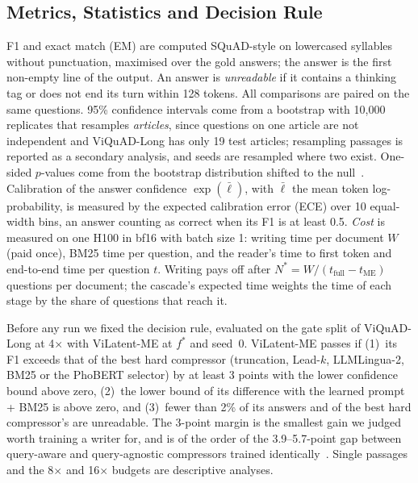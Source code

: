 \subsection{Metrics, Statistics and Decision Rule}
\label{sec:stats}
F1 and exact match (EM) are computed SQuAD-style on lowercased syllables without punctuation, maximised over the gold answers; the answer is the first non-empty line of the output.
An answer is \emph{unreadable} if it contains a thinking tag or does not end its turn within 128 tokens.
All comparisons are paired on the same questions.
95\% confidence intervals come from a bootstrap with 10,000 replicates that resamples \emph{articles}, since questions on one article are not independent and ViQuAD-Long has only 19 test articles; resampling passages is reported as a secondary analysis, and seeds are resampled where two exist.
One-sided $p$-values come from the bootstrap distribution shifted to the null~\cite{efron1993bootstrap}.
Calibration of the answer confidence $\exp(\bar\ell)$, with $\bar\ell$ the mean token log-probability, is measured by the expected calibration error (ECE) over 10 equal-width bins, an answer counting as correct when its F1 is at least 0.5.
\emph{Cost} is measured on one H100 in bf16 with batch size 1: writing time per document $W$ (paid once), BM25 time per question, and the reader's time to first token and end-to-end time per question $t$.
Writing pays off after $N^\ast = W / (t_{\mathrm{full}} - t_{\mathrm{ME}})$ questions per document; the cascade's expected time weights the time of each stage by the share of questions that reach it.

Before any run we fixed the decision rule, evaluated on the gate split of ViQuAD-Long at 4$\times$ with ViLatent-ME at $f^\ast$ and seed~0.
ViLatent-ME passes if
(1)~its F1 exceeds that of the best hard compressor (truncation, Lead-$k$, LLMLingua-2, BM25 or the PhoBERT selector) by at least 3 points with the lower confidence bound above zero,
(2)~the lower bound of its difference with the learned prompt + BM25 is above zero, and
(3)~fewer than 2\% of its answers and of the best hard compressor's are unreadable.
The 3-point margin is the smallest gain we judged worth training a writer for, and is of the order of the 3.9--5.7-point gap between query-aware and query-agnostic compressors trained identically~\cite{sakhno2026adamem}.
Single passages and the 8$\times$ and 16$\times$ budgets are descriptive analyses.
